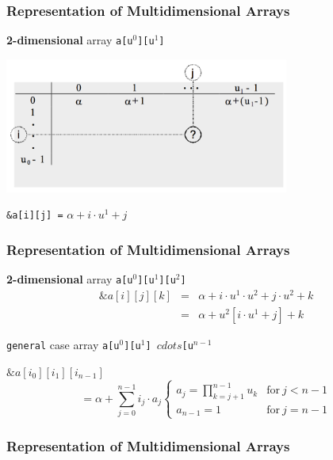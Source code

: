 \documentclass[newPxFont,sthlmFooter,nooffset]{beamer}
\begin{document}
\begin{frame}[t, fragile]
  \frametitle{Representation of Multidimensional Arrays}
\textbf{2-dimensional} array \texttt{a[u$^0$][u$^1$]}

\includegraphics[width=0.7\textwidth]{figures/fig02_2-dim_array.png}

\texttt{\&a[i][j] =} $\alpha+i\cdot u^1 + j$
\end{frame}


\begin{frame}[t, fragile]
  \frametitle{Representation of Multidimensional Arrays}
\textbf{2-dimensional} array \texttt{a[u$^0$][u$^1$][u$^2$]}
\begin{eqnarray*}
\&a[i][j][k] &=& \alpha + i\cdot u^1 \cdot u^2 + j\cdot u^2 +k \\
             &=& \alpha + u^2[i \cdot u^1 + j] +k
\end{eqnarray*}

\texttt{general} case array \texttt{a[u$^0$][u$^1$] $cdots$[u$^{n-1}$}

$\&a[i_0][i_1][i_{n-1}]$
\begin{equation*}
  = \alpha + \sum^{n-1}_{j=0} i_j \cdot a_j
  \begin{cases}
    a_j = \prod^{n-1}_{k=j+1} u_k & \text{for} ~j < n-1\\
    a_{n-1} = 1 & \text{for} ~j = n-1
  \end{cases}
\end{equation*}
\end{frame}


\begin{frame}[t, fragile]
  \frametitle{Representation of Multidimensional Arrays}

\end{frame}
\end{document}
